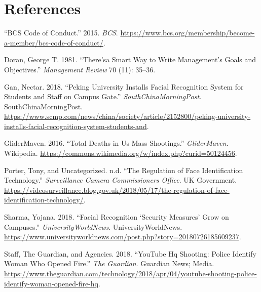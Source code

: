 \documentclass[
  english,
  a4paper,
,tablecaptionabove
]{scrartcl}
\begin{document}
\hypertarget{references}{%
\section*{References}\label{references}}

\hypertarget{refs}{}
\leavevmode\hypertarget{ref-bcs}{}%
``BCS Code of Conduct.'' 2015. \emph{BCS}.
\url{https://www.bcs.org/membership/become-a-member/bcs-code-of-conduct/}.

\leavevmode\hypertarget{ref-doran1981there}{}%
Doran, George T. 1981. ``There'sa Smart Way to Write Management's Goals
and Objectives.'' \emph{Management Review} 70 (11): 35--36.

\leavevmode\hypertarget{ref-china-facerec}{}%
Gan, Nectar. 2018. ``Peking University Installs Facial Recognition
System for Students and Staff on Campus Gate.''
\emph{SouthChinaMorningPost}. SouthChinaMorningPost.
\url{https://www.scmp.com/news/china/society/article/2152800/peking-university-installs-facial-recognition-system-students-and}.

\leavevmode\hypertarget{ref-glidermaven}{}%
GliderMaven. 2016. ``Total Deaths in Us Mass Shootings.''
\emph{GliderMaven}. Wikipedia.
\url{https://commons.wikimedia.org/w/index.php?curid=50124456}.

\leavevmode\hypertarget{ref-porter_uncategorized}{}%
Porter, Tony, and Uncategorized. n.d. ``The Regulation of Face
Identification Technology.'' \emph{Surveillance Camera Commissioners
Office}. UK Government.
\url{https://videosurveillance.blog.gov.uk/2018/05/17/the-regulation-of-face-identification-technology/}.

\leavevmode\hypertarget{ref-china-facialrec}{}%
Sharma, Yojana. 2018. ``Facial Recognition `Security Measures' Grow on
Campuses.'' \emph{UniversityWorldNews}. UniversityWorldNews.
\url{https://www.universityworldnews.com/post.php?story=20180726185609237}.

\leavevmode\hypertarget{ref-agencies_2018}{}%
Staff, The Guardian, and Agencies. 2018. ``YouTube Hq Shooting: Police
Identify Woman Who Opened Fire.'' \emph{The Guardian}. Guardian News;
Media.
\url{https://www.theguardian.com/technology/2018/apr/04/youtube-shooting-police-identify-woman-opened-fire-hq}.
\end{document}
